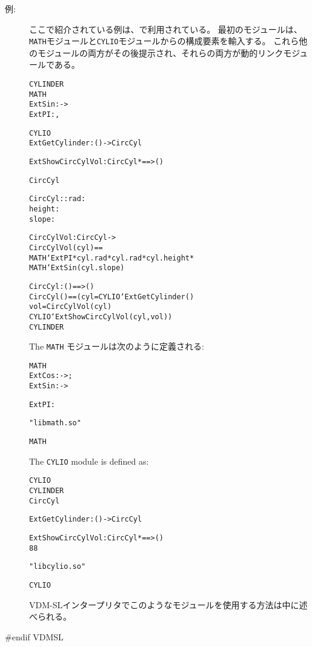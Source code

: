 \documentclass[\pformat,12pt]{jarticle}
\begin{document}
\begin{description}
\item[例:] ここで紹介されている例は、\cite{DLMan-SCSK}で利用されている。
最初のモジュールは、{\tt MATH}モジュールと{\tt CYLIO}モジュールからの構成要素を輸入する。 
これら他のモジュールの両方がその後提示され、それらの両方が動的リンクモジュールである。
\begin{alltt}
 CYLINDER
     MATH
          ExtSin :  -> 
          ExtPI : ,

     CYLIO
          ExtGetCylinder : () -> CircCyl
   
          ExtShowCircCylVol : CircCyl *  ==> ()

         CircCyl  

        CircCyl :: rad    : 
                   height : 
                   slope  : 
	
        CircCylVol : CircCyl -> 
        CircCylVol(cyl) ==
          MATH`ExtPI * cyl.rad * cyl.rad * cyl.height * 
          MATH`ExtSin(cyl.slope)

        CircCyl : () ==> ()
        CircCyl() == (  cyl = CYLIO`ExtGetCylinder()  
                          vol = CircCylVol(cyl) 
                            CYLIO`ExtShowCircCylVol(cyl, vol))
 CYLINDER
\end{alltt}

The {\tt MATH} モジュールは次のように定義される:

\begin{alltt}
 MATH
      ExtCos :  -> ;
      ExtSin :  ->   
      
      ExtPI : 
  
      "libmath.so" 

 MATH
\end{alltt}

The {\tt CYLIO} module is defined as:

\begin{alltt}
 CYLIO
     CYLINDER
        CircCyl

       ExtGetCylinder : () -> CircCyl
   
       ExtShowCircCylVol : CircCyl *  ==> ()
  88 

      "libcylio.so"

 CYLIO
\end{alltt}

VDM-SLインタープリタでこのようなモジュールを使用する方法は\cite{DLMan-SCSK}中に述べられる。
\end{description}
#endif VDMSL
\end{document}
